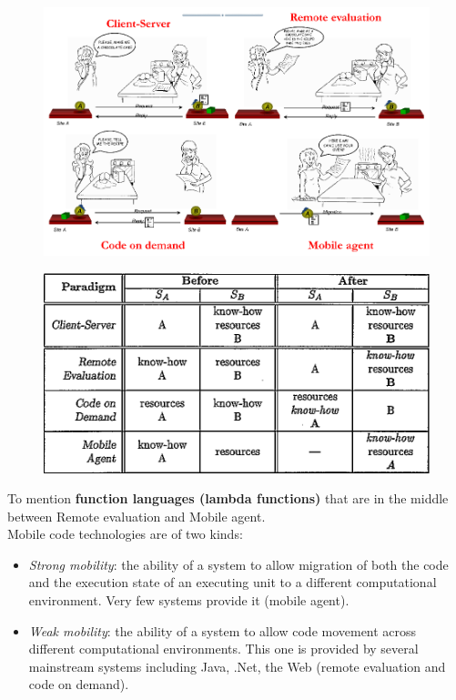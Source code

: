 \documentclass[10pt,a4paper]{article}
\begin{document}
\begin{figure}[h!]
\centering
\begin{minipage}{.5\textwidth}
  \centering
  \includegraphics[width=.9\linewidth]{images/mobile-paradigms2.png}
  \label{fig:mobilepvisual}
\end{minipage}%
\begin{minipage}{.5\textwidth}
  \centering
  \includegraphics[width=.9\linewidth]{images/mobile-paradigms.png}
  \label{fig:mobileptable}
\end{minipage}
\end{figure} 
To mention \textbf{function languages (lambda functions)} that are in the middle between Remote evaluation and Mobile agent. \\
Mobile code technologies are of two kinds:
\begin{itemize}
	\item \textit{Strong mobility}: the ability of a system to allow migration of both the code and the execution state of an executing unit to a different computational environment. Very few systems provide it (mobile agent).
	\item \textit{Weak mobility}: the ability of a system to allow code movement across different computational environments. This one is provided by several mainstream systems including Java, .Net, the Web (remote evaluation and code on demand). 
\end{itemize}
\end{document}
